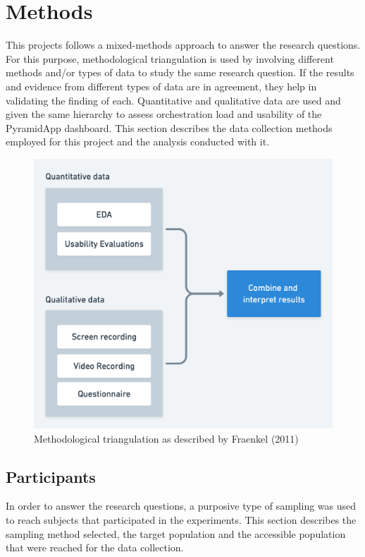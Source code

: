 \normallinespacing

\chapter{Methods}
This projects follows a mixed-methods approach to answer the research questions. For this purpose, methodological triangulation is used by involving different methods and/or types of data to study the same research question. If the results and evidence from different types of data are in agreement, they help in validating the finding of each\cite{fraenkel_wallen_hyun_2019}. Quantitative and qualitative data are used and given the same hierarchy to assess orchestration load and usability of the PyramidApp dashboard. This section describes the data collection methods employed for this project and the analysis conducted with it.
\begin{figure}[!h]
    \includegraphics[clip,width=\columnwidth]{Figures/triangulation.png}%
\caption{Methodological triangulation as described by Fraenkel (2011)}
\label{fig:triangulation}
\end{figure}
\section{Participants}
In order to answer the research questions, a purposive type of sampling was used to reach subjects that participated in the experiments. This section describes the sampling method selected, the target population and the accessible population that were reached for the data collection.
